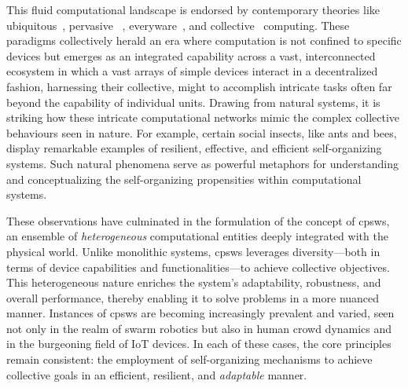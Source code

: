 \begin{refsection}
This fluid computational landscape is endorsed by contemporary theories like  ubiquitous~\cite{ubiquitous}, pervasive
 ~\cite{DBLP:journals/computer/SahaM03}, everyware~\cite{greenfield2010everyware}, and collective~\cite{DBLP:journals/computer/Abowd16} computing.
%
These paradigms collectively herald an era where computation 
 is not confined to specific devices but emerges as an integrated capability across a vast, 
 interconnected ecosystem in which a vast arrays of simple devices interact in a decentralized fashion, 
 harnessing their collective, might to accomplish intricate tasks often far beyond the capability of individual units. 
%
Drawing from natural systems, 
 it is striking how these intricate computational networks mimic the complex collective behaviours seen in nature. 
 For example, certain social insects, like ants and bees, display remarkable examples of resilient, effective, and efficient self-organizing systems. 
 Such natural phenomena serve as powerful metaphors for understanding and conceptualizing the self-organizing propensities within computational systems.
 
These observations have culminated in the formulation of the concept of \acp{cpsw}, 
 an ensemble of \emph{heterogeneous} computational entities deeply integrated with the physical world. Unlike monolithic systems, \acp{cpsw} leverages diversity—both in terms of device capabilities and functionalities—to achieve collective objectives. 
 This heterogeneous nature enriches the system's adaptability, robustness, and overall performance, thereby enabling it to solve problems in a more nuanced manner.
%
Instances of \acp{cpsw} are becoming increasingly prevalent and varied, 
 seen not only in the realm of swarm robotics but also in human crowd dynamics and in the burgeoning field of IoT devices. 
 In each of these cases, the core principles remain consistent: the employment of self-organizing mechanisms to achieve collective goals in an efficient, resilient, and \emph{adaptable} manner.


\end{refsection}
